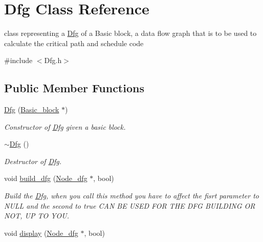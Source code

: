 \hypertarget{classDfg}{\section{\-Dfg \-Class \-Reference}
\label{classDfg}
}


class representing a \hyperlink{classDfg}{\-Dfg} of a \-Basic block, a data flow graph that is to be used to calculate the critical path and schedule code  




{\ttfamily \#include $<$\-Dfg.\-h$>$}

\subsection*{\-Public \-Member \-Functions}
\begin{DoxyCompactItemize}
\item 
\hypertarget{classDfg_aea8238bc912efa232319120cb1021fc1}{\hyperlink{classDfg_aea8238bc912efa232319120cb1021fc1}{\-Dfg} (\hyperlink{classBasic__block}{\-Basic\-\_\-block} $\ast$)}\label{classDfg_aea8238bc912efa232319120cb1021fc1}

\begin{DoxyCompactList}\small\item\em \-Constructor of \hyperlink{classDfg}{\-Dfg} given a basic block. \end{DoxyCompactList}\item 
\hypertarget{classDfg_a1422059d38caedf1ed3897a6f89109d8}{\hyperlink{classDfg_a1422059d38caedf1ed3897a6f89109d8}{$\sim$\-Dfg} ()}\label{classDfg_a1422059d38caedf1ed3897a6f89109d8}

\begin{DoxyCompactList}\small\item\em \-Destructor of \hyperlink{classDfg}{\-Dfg}. \end{DoxyCompactList}\item 
\hypertarget{classDfg_a32426a0b87ae751c5a43a00629bde5e5}{void \hyperlink{classDfg_a32426a0b87ae751c5a43a00629bde5e5}{build\-\_\-dfg} (\hyperlink{classNode__dfg}{\-Node\-\_\-dfg} $\ast$, bool)}\label{classDfg_a32426a0b87ae751c5a43a00629bde5e5}

\begin{DoxyCompactList}\small\item\em \-Build the \hyperlink{classDfg}{\-Dfg}, when you call this method you have to affect the fisrt parameter to \-N\-U\-L\-L and the second to true \-C\-A\-N \-B\-E \-U\-S\-E\-D \-F\-O\-R \-T\-H\-E \-D\-F\-G \-B\-U\-I\-L\-D\-I\-N\-G \-O\-R \-N\-O\-T, \-U\-P \-T\-O \-Y\-O\-U. \end{DoxyCompactList}\item 
\hypertarget{classDfg_a19e39ead57755ba83008c3938c2b4c5d}{void \hyperlink{classDfg_a19e39ead57755ba83008c3938c2b4c5d}{display} (\hyperlink{classNode__dfg}{\-Node\-\_\-dfg} $\ast$, bool)}\label{classDfg_a19e39ead57755ba83008c3938c2b4c5d}


\end{DoxyCompactItemize}

